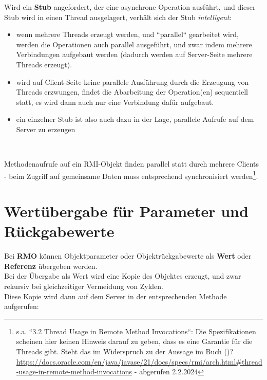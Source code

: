 \noindent
Wird ein \textbf{Stub} angefordert, der eine asynchrone Operation ausführt, und dieser Stub wird in einen Thread ausgelagert, verhält sich der Stub \textit{intelligent}:

\begin{itemize}
    \item wenn mehrere Threads erzeugt werden, und ``parallel`` gearbeitet wird, werden die Operationen auch parallel ausgeführt, und zwar indem mehrere Verbindungen aufgebaut werden (dadurch werden auf Server-Seite mehrere Threads erzeugt).
    \item wird auf Client-Seite keine parallele Ausführung durch die Erzeugung von Threads erzwungen, findet die Abarbeitung der Operation(en) sequentiell statt, es wird dann auch nur eine Verbindung dafür aufgebaut.
    \item ein einzelner Stub ist also auch dazu in der Lage, parallele Aufrufe auf dem Server zu erzeugen
\end{itemize}\\


\begin{tcolorbox}
    Methodenaufrufe auf ein RMI-Objekt finden parallel statt durch mehrere Clients - beim Zugriff auf gemeinsame Daten muss entsprechend synchronisiert werden\footnote{
        s.a. ``3.2 Thread Usage in Remote Method Invocations``: Die Spezifikationen scheinen hier keinen Hinweis darauf zu geben, dass es eine Garantie für die Threads gibt. Steht das im Widerspruch zu der Aussage im Buch (\cite[330]{Oec22})? \url{https://docs.oracle.com/en/java/javase/21/docs/specs/rmi/arch.html#thread-usage-in-remote-method-invocations} - abgerufen 2.2.2024
    }.
\end{tcolorbox}

\section{Wertübergabe für Parameter und Rückgabewerte}

Bei \textbf{RMO} können Objektparameter oder Objektrückgabewerte als \textbf{Wert} oder \textbf{Referenz} übergeben werden.\\

\noindent
Bei der Übergabe als Wert wird eine Kopie des Objektes erzeugt, und zwar rekursiv bei gleichzeitiger Vermeidung von Zyklen.\\

\noindent
Diese Kopie wird dann auf dem Server in der entsprechenden Methode aufgerufen:


